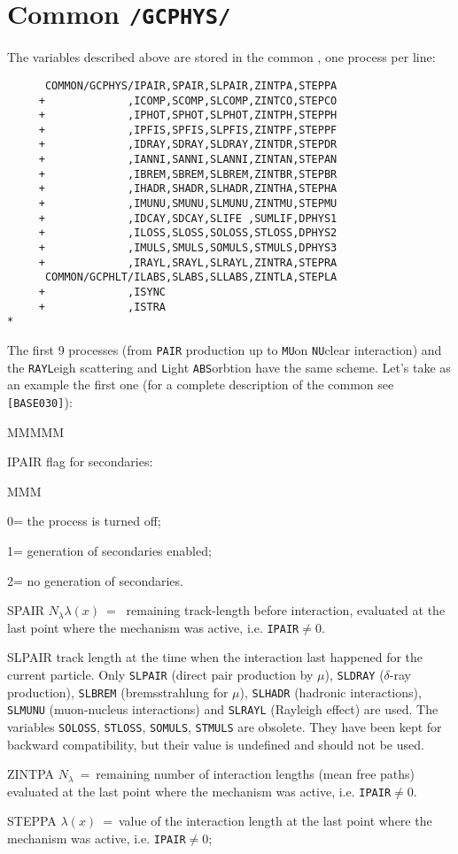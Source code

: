 \section{Common {\tt /GCPHYS/}}
The variables described above are stored in the common ,
one process per line:
\begin{verbatim}
      COMMON/GCPHYS/IPAIR,SPAIR,SLPAIR,ZINTPA,STEPPA
     +             ,ICOMP,SCOMP,SLCOMP,ZINTCO,STEPCO
     +             ,IPHOT,SPHOT,SLPHOT,ZINTPH,STEPPH
     +             ,IPFIS,SPFIS,SLPFIS,ZINTPF,STEPPF
     +             ,IDRAY,SDRAY,SLDRAY,ZINTDR,STEPDR
     +             ,IANNI,SANNI,SLANNI,ZINTAN,STEPAN
     +             ,IBREM,SBREM,SLBREM,ZINTBR,STEPBR
     +             ,IHADR,SHADR,SLHADR,ZINTHA,STEPHA
     +             ,IMUNU,SMUNU,SLMUNU,ZINTMU,STEPMU
     +             ,IDCAY,SDCAY,SLIFE ,SUMLIF,DPHYS1
     +             ,ILOSS,SLOSS,SOLOSS,STLOSS,DPHYS2
     +             ,IMULS,SMULS,SOMULS,STMULS,DPHYS3
     +             ,IRAYL,SRAYL,SLRAYL,ZINTRA,STEPRA
      COMMON/GCPHLT/ILABS,SLABS,SLLABS,ZINTLA,STEPLA
     +             ,ISYNC
     +             ,ISTRA
*
\end{verbatim}
The first 9 processes (from {\tt PAIR} production up to {\tt MU}on
{\tt NU}clear interaction) and the {\tt RAYL}eigh scattering and
{\tt L}ight {\tt ABS}orbtion
have the same scheme. Let's take as an example
the first one (for a complete description of the common see
{\tt [BASE030]}):
\begin{DLtt}{MMMMM}
\item[IPAIR ]flag for secondaries:
\begin{DLtt}{MMM}
\item[0=] the process is turned off;
\item[1=] generation of secondaries enabled;
\item[2=] no generation of secondaries.
\end{DLtt}
\item [SPAIR ] $ N_\lambda \lambda (x) \: = \: $
remaining track-length before interaction, evaluated at the last point
where the mechanism was active, i.e. {\tt IPAIR}$ \neq 0$.
\item[SLPAIR] track length at the time when the interaction last
happened for the current particle. Only {\tt SLPAIR}
(direct pair production by $\mu$), {\tt SLDRAY} ($\delta$-ray production),
{\tt SLBREM} (bremsstrahlung for $\mu$), {\tt SLHADR} (hadronic
interactions), {\tt SLMUNU} (muon-nucleus interactions) and {\tt SLRAYL}
(Rayleigh effect) are used.  The variables
{\tt SOLOSS}, {\tt STLOSS}, {\tt SOMULS}, {\tt STMULS} are obsolete. 
They have been kept for backward compatibility, but their value
is undefined and should not be used.
\item[ZINTPA] $N_\lambda \: = \: $remaining number of interaction
lengths (mean free paths)
evaluated at the last point where the mechanism was active, i.e.
{\tt IPAIR}$ \neq 0$.
\item[STEPPA] $ \lambda (x) \: = \:$value of the interaction length at the
last point where the mechanism was active, i.e. {\tt IPAIR}$ \neq 0$;
\end{DLtt}

